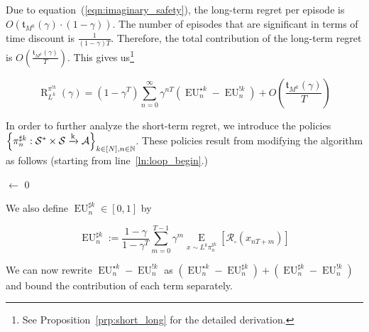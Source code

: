 \documentclass[anon,12pt]{colt2018} %
\newcommand{\AP}[1]{\left(#1\right)}
\newcommand{\AB}[1]{\left[#1\right]}
\newcommand{\AC}[1]{\left\{#1\right\}}
\newcommand{\Ea}[2]{\underset{#1}{\operatorname{E}}\AB{#2}}
\newcommand{\Nats}{\mathbb{N}}
\newcommand{\K}{\xrightarrow{\textnormal{k}}}
\newcommand{\A}{\mathcal{A}}
\newcommand{\St}{\mathcal{S}}
\newcommand{\R}{\mathcal{R}}
\newcommand{\EU}{\operatorname{EU}}
\newcommand{\Rg}{\operatorname{R}}
\newcommand{\MP}[2]{#1#2}
\newcommand{\Tn}{\mathfrak{t}}
\newcommand{\IP}{\pi^{!k}}
\begin{document}
Due to equation~(\ref{eqn:imaginary_safety}), the long-term regret per episode is $O\AP{\Tn_{M^k}(\gamma)\cdot(1-\gamma)}$. The number of episodes that are significant in terms of time discount is $\frac{1}{(1-\gamma)T}$. Therefore, the total contribution of the long-term regret is $O\AP{\frac{\Tn_{M^k}(\gamma)}{T}}$. This gives us\footnote{See Proposition~\ref{prp:short_long} for the detailed derivation.}

\begin{equation}
\label{eqn:short_long_decomposition}
\Rg_{L^k}^{\IP}(\gamma) = \AP{1-\gamma^T}\sum_{n=0}^\infty \gamma^{nT}\AP{\EU^{\star k}_n-\EU^{!k}_n}+O\AP{\frac{\Tn_{M^k}(\gamma)}{T}}
\end{equation}

In order to further analyze the short-term regret, we introduce the policies\\$\AC{\pi_n^{\sharp k}: \St^* \times \St \K \A}_{k \in [N],n \in \Nats}$. These policies result from modifying the algorithm as follows (starting from line~\ref{ln:loop_begin}.)

\begin{algorithm}[h]

\setcounter{AlgoLine}{2}


\Counter$\leftarrow$ 0\;


\end{algorithm}

We also define $\EU^{\sharp k}_n\in[0,1]$ by

\begin{equation}
\label{eqn:eusharp}
\EU_n^{\sharp k}:=\frac{1-\gamma}{1-\gamma^T}\sum_{m=0}^{T-1} \gamma^m \Ea{x\sim{\MP{L^k}{\pi_n^{\sharp  k}}}}{\R_\square\AP{x_{nT+m}}}
\end{equation}

We can now rewrite $\EU^{\star k}_n-\EU^{!k}_n$ as $\AP{\EU^{\star k}_n-\EU^{\sharp k}_n}+\AP{\EU^{\sharp k}_n-\EU^{!k}_n}$ and bound the contribution of each term separately.
\end{document}
